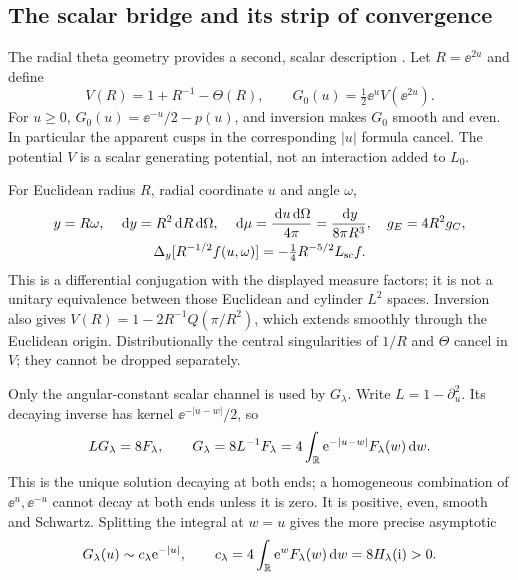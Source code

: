 \subsection{The scalar bridge and its strip of convergence}
The radial theta geometry provides a second, scalar description
\cite{RadialCompanion,TNDParent}. Let $R=\ee^{2u}$ and define
\begin{equation}\label{eq:VG}
 V(R)=1+R^{-1}-\Theta(R),\qquad
 G_0(u)=\tfrac12\ee^u V(\ee^{2u}).
\end{equation}
For $u\ge0$, $G_0(u)=\ee^{-u}/2-p(u)$, and inversion makes $G_0$
smooth and even. In particular the apparent cusps in the corresponding
$|u|$ formula cancel. The potential $V$ is a scalar generating potential,
not an interaction added to $L_0$.

For Euclidean radius $R$, radial coordinate $u$ and angle $\omega$,
\begin{equation}\label{eq:measureconjugation}
 \begin{gathered}
 y=R\omega,\quad \,\mathrm d y=R^2\,\mathrm d R\,\mathrm d\Omega,
 \quad \,\mathrm d\mu=\frac{\,\mathrm d u\,\mathrm d\Omega}{4\pi}
              =\frac{\,\mathrm d y}{8\pi R^3},\quad g_E=4R^2g_C,\\
 \Delta_y[R^{-1/2}f(u,\omega)]
 =-\tfrac14R^{-5/2}L_{\mathrm{sc}} f.
 \end{gathered}
\end{equation}
This is a differential conjugation with the displayed measure factors;
it is not a unitary equivalence between those Euclidean and cylinder
$L^2$ spaces. Inversion also gives
$V(R)=1-2R^{-1}Q(\pi/R^2)$, which extends smoothly through the Euclidean
origin. Distributionally the central singularities of $1/R$ and
$\Theta$ cancel in $V$; they cannot be dropped separately.

Only the angular-constant scalar channel is used by $G_\lambda$.
Write $L=1-\partial_u^2$. Its decaying inverse has kernel
$\ee^{-|u-w|}/2$, so
\begin{equation}\label{eq:Glambda}
 LG_\lambda=8F_\lambda,\qquad
 G_\lambda=8L^{-1}F_\lambda
 =4\int_\mathbb R\mathrm e^{-|u-w|}F_\lambda(w)\,\mathrm d w.
\end{equation}
This is the unique solution decaying at both ends; a homogeneous
combination of $\ee^u,\ee^{-u}$ cannot decay at both ends unless it is zero.
It is positive, even, smooth and Schwartz. Splitting the integral at $w=u$
gives the more precise asymptotic
\begin{equation}\label{eq:Gtail}
 G_\lambda(u)\sim c_\lambda\mathrm e^{-|u|},\qquad
 c_\lambda=4\int_\mathbb R\mathrm e^wF_\lambda(w)\,\mathrm d w=8H_\lambda(\mathrm i)>0.
\end{equation}

